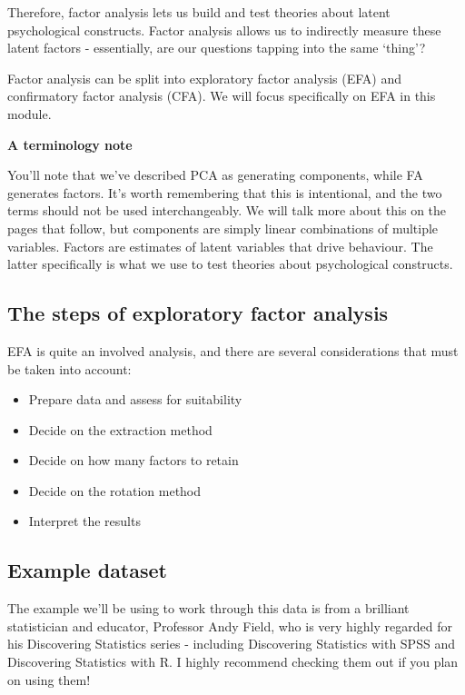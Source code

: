 \documentclass[
]{book}
\providecommand{\tightlist}{%
  \setlength{\itemsep}{0pt}\setlength{\parskip}{0pt}}
\begin{document}
Therefore, factor analysis lets us build and test theories about latent psychological constructs. Factor analysis allows us to indirectly measure these latent factors - essentially, are our questions tapping into the same `thing'?

Factor analysis can be split into exploratory factor analysis (EFA) and confirmatory factor analysis (CFA). We will focus specifically on EFA in this module.

\textbf{A terminology note}

You'll note that we've described PCA as generating components, while FA generates factors. It's worth remembering that this is intentional, and the two terms should not be used interchangeably. We will talk more about this on the pages that follow, but components are simply linear combinations of multiple variables. Factors are estimates of latent variables that drive behaviour. The latter specifically is what we use to test theories about psychological constructs.

\hypertarget{the-steps-of-exploratory-factor-analysis}{%
\subsection{The steps of exploratory factor analysis}\label{the-steps-of-exploratory-factor-analysis}}

EFA is quite an involved analysis, and there are several considerations that must be taken into account:

\begin{itemize}
\tightlist
\item
  Prepare data and assess for suitability
\item
  Decide on the extraction method
\item
  Decide on how many factors to retain
\item
  Decide on the rotation method
\item
  Interpret the results
\end{itemize}

\hypertarget{example-dataset}{%
\subsection{Example dataset}\label{example-dataset}}

The example we'll be using to work through this data is from a brilliant statistician and educator, Professor Andy Field, who is very highly regarded for his Discovering Statistics series - including Discovering Statistics with SPSS and Discovering Statistics with R. I highly recommend checking them out if you plan on using them!
\end{document}
